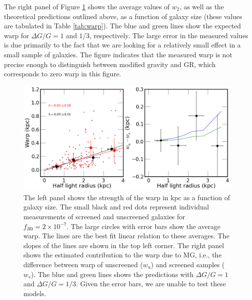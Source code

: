 \documentclass[twocolappendix, numberedappendix]{emulateapj}
\begin{document}
The right panel of Figure \ref{fig:size-warp-kpc} shows the average
values of $w_2$, as well as the theoretical predictions outlined
above, as a function of galaxy size (these values are tabulated
in Table \ref{tab:warp}).
The blue and green lines show the expected warp for $\Delta G/G
= 1$ and $1/3$, respectively.
The large error in the measured values
is due primarily to the fact that we are looking for a
relatively small effect in a small sample of galaxies.
The figure indicates that the measured warp is not precise enough to
distinguish between modified gravity and GR, which corresponds to zero
warp in this figure.


\begin{figure}
\begin{center}
\includegraphics[scale=0.43]{figures/size-warpness-kpc.png}
\caption{The left panel shows the strength of the warp in kpc as a function of
galaxy size. The small black and red dots
represent individual measurements of screened and unscreened galaxies for
$f_{R0} = 2 \times10^{-7}$. The large circles
with error bars show the average warp.  The
lines are the best fit linear relation to these averages. The slopes of
the lines are shown in the top left corner. The right panel shows the estimated
contribution to the warp due to MG, i.e., the difference between warp
of unscreened
($w_u$) and screened samples ($w_s$). The blue and green lines shows the
predictions with $\Delta G/G = 1$ and $\Delta G/G = 1/3$. Given the error
bars, we are unable to test these models. 
}
\label{fig:size-warp-kpc}
\end{center}
\end{figure}
\end{document}
